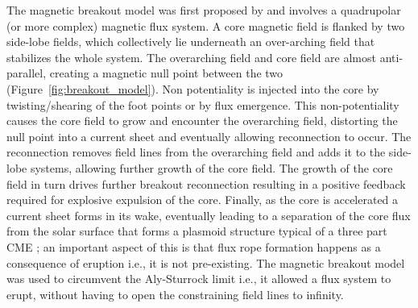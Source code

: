 The magnetic breakout model was first proposed by \citep{antiochos1999} and involves a quadrupolar (or more complex) magnetic flux system. A core magnetic field is flanked by two side-lobe fields, which collectively lie underneath an over-arching field that stabilizes the whole system. The overarching field and core field are almost anti-parallel, creating a magnetic null point between the two (Figure~\ref{fig:breakout_model}). Non potentiality is injected into the core by twisting/shearing of the foot points or by flux emergence. This non-potentiality causes the core field to grow and encounter the overarching field, distorting the null point into a current sheet and eventually allowing reconnection to occur. The reconnection removes field lines from the overarching field and adds it to the side-lobe systems, allowing further growth of the core field. The growth of the core field in turn drives further breakout reconnection resulting in a positive feedback required for explosive expulsion of the core. Finally, as the core is accelerated a current sheet forms in its wake, eventually leading to a separation of the core flux from the solar surface that forms a plasmoid structure typical of a three part CME \citep{lynch2004}; an important aspect of this is that flux rope formation happens as a consequence of eruption i.e., it is not pre-existing. The magnetic breakout model was used to circumvent the Aly-Sturrock limit \citep{aly1991, sturrock1991} i.e., it allowed a flux system to erupt, without having to open the constraining field lines to infinity.
